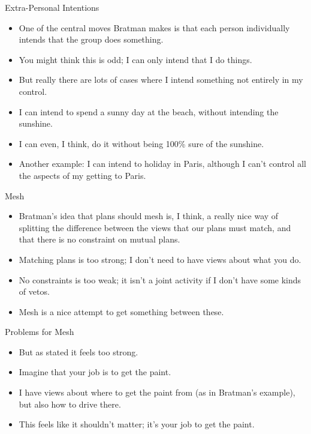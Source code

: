 \documentclass[
  ignorenonframetext,
]{beamer}
\providecommand{\tightlist}{%
  \setlength{\itemsep}{0pt}\setlength{\parskip}{0pt}}
\begin{document}
\begin{frame}{Extra-Personal Intentions}
\protect\hypertarget{extra-personal-intentions}{}
\begin{itemize}
\tightlist
\item
  One of the central moves Bratman makes is that each person
  individually intends that the group does something.
\item
  You might think this is odd; I can only intend that I do things.
  \pause
\item
  But really there are lots of cases where I intend something not
  entirely in my control.
\item
  I can intend to spend a sunny day at the beach, without intending the
  sunshine. \pause
\item
  I can even, I think, do it without being 100\% sure of the sunshine.
  \pause
\item
  Another example: I can intend to holiday in Paris, although I can't
  control all the aspects of my getting to Paris.
\end{itemize}
\end{frame}

\begin{frame}{Mesh}
\protect\hypertarget{mesh}{}
\begin{itemize}
\tightlist
\item
  Bratman's idea that plans should mesh is, I think, a really nice way
  of splitting the difference between the views that our plans must
  match, and that there is no constraint on mutual plans.
\item
  Matching plans is too strong; I don't need to have views about what
  you do.
\item
  No constraints is too weak; it isn't a joint activity if I don't have
  some kinds of vetos.
\item
  Mesh is a nice attempt to get something between these.
\end{itemize}
\end{frame}

\begin{frame}{Problems for Mesh}
\protect\hypertarget{problems-for-mesh}{}
\begin{itemize}
\tightlist
\item
  But as stated it feels too strong.
\item
  Imagine that your job is to get the paint.
\item
  I have views about where to get the paint from (as in Bratman's
  example), but also how to drive there.
\item
  This feels like it shouldn't matter; it's your job to get the paint.
\end{itemize}
\end{frame}
\end{document}
